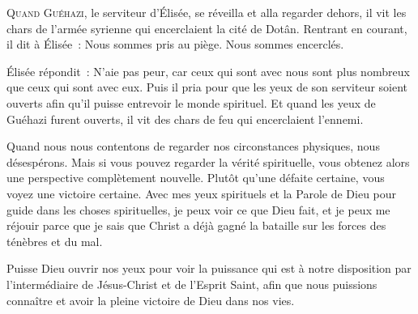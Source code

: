 


\lettrine{Q}{uand Guéhazi,} le serviteur d'Élisée, se réveilla
 et alla regarder dehors, il vit les chars de l'armée syrienne
 qui encerclaient la cité de Dotân.
 Rentrant en courant, il dit à Élisée~:
 \og Nous sommes pris au piège. Nous sommes encerclés. \fg{}

Élisée répondit~:
 \og N'aie pas peur, car ceux qui sont avec nous sont plus nombreux
 que ceux qui sont avec eux. \fg{}
 Puis il pria pour que les yeux de son serviteur soient ouverts
 afin qu'il puisse entrevoir le monde spirituel.
 Et quand les yeux de Guéhazi furent ouverts,
 il vit des chars de feu qui encerclaient l'ennemi. 


Quand nous nous contentons de regarder nos circonstances physiques,
 nous désespérons. Mais si vous pouvez regarder la vérité spirituelle,
 vous obtenez alors une perspective complètement nouvelle.
 Plutôt qu'une défaite certaine, vous voyez une victoire certaine.
 Avec mes yeux spirituels et la Parole de Dieu pour guide
 dans les choses spirituelles, je peux voir ce que Dieu fait,
 et je peux me réjouir parce que je sais que Christ a déjà gagné
 la bataille sur les forces des ténèbres et du mal. 

Puisse Dieu ouvrir nos yeux pour voir la puissance qui est à notre
 disposition par l'intermédiaire de Jésus-Christ et de l'Esprit Saint, 
 afin que nous puissions connaître et avoir la pleine victoire de Dieu
 dans nos vies. 

\dvrule






